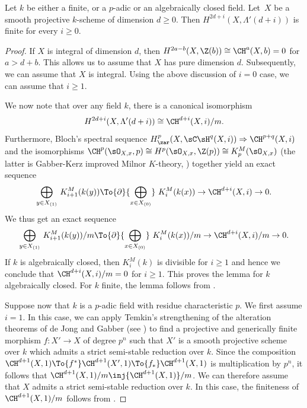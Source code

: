 \begin{lem}\label{lem:smooth-proj-fin}
Let $k$ be either a finite, or a $p$-adic or an algebraically closed field.
Let~$X$ be a smooth projective $k$-scheme of dimension $d \ge 0$.
Then $H^{2d+i}(X, \Lambda'(d+i))$ is finite for every $i \ge 0$.
\end{lem}
\begin{proof}
If $X$ is integral of dimension $d$, then $H^{2a-b}(X, \Z(b)) \cong
\CH^a(X, b) = 0$ for $a > d+b$. This allows us to assume that
$X$ has pure dimension $d$. Subsequently, we can assume that $X$ is integral.
Using the above discussion of $i = 0$ case, we can assume that $i \ge 1$.

We now note that over any field $k$, there is a canonical isomorphism
\[
H^{2d+i}(X, \Lambda'(d+i)) \cong {\CH^{d+i}(X, i)}/m.
\]
Furthermore, Bloch's spectral sequence $H^p_\zar(X, {\sC}{\sH}^q(X,i))
\Rightarrow \CH^{p+q}(X,i)$ and
the isomorphisms $\CH^p(\sO_{X,x}, p) \cong
H^p(\sO_{X,x}, \Z(p)) \cong K^M_p(\sO_{X,x})$
(the latter is Gabber-Kerz improved Milnor $K$-theory, \cite{Kerz10})
together yield an exact sequence
\begin{equation}\label{eqn:smooth-proj-fin-0}
{\underset{y \in X_{(1)}}\bigoplus} \ K^M_{i+1}(k(y))
\To{\partial} {\underset{x \in X_{(0)}}\bigoplus} \ K^M_{i}(k(x))
\to \CH^{d+i}(X, i) \to 0.
\end{equation}
We thus get an exact sequence
\begin{equation}\label{eqn:smooth-proj-fin-2}
{\underset{y \in X_{(1)}}\bigoplus} \ {K^M_{i+1}(k(y))}/m
\To{\partial} {\underset{x \in X_{(0)}}\bigoplus} \ {K^M_{i}(k(x))}/m
\to {\CH^{d+i}(X, i)}/m \to 0.
\end{equation}
If $k$ is algebraically closed, then $K^M_{i}(k)$ is divisible for $i \ge 1$
and hence we conclude that ${\CH^{d+i}(X, i)}/m = 0$ for $i \ge 1$.
This proves the lemma for $k$ algebraically closed.
For $k$ finite, the lemma follows from \cite[Th.\,1.2, 1.3]{Akthar}.

Suppose now that $k$ is a $p$-adic field with residue characteristic $p$.
We first assume $i =1$. In this case, we can apply Temkin's
strengthening of the alteration theorems of de Jong and Gabber
(see \cite[Th.\,1.2.5]{Temkin}) to find a projective and generically
finite morphism $f \colon X' \to X$ of degree $p^n$ such that
$X'$ is a smooth projective scheme over $k$ which admits a strict semi-stable
reduction over $k$. Since the composition $\CH^{d+1}(X, 1)
\To{f^*} \CH^{d+1}(X', 1) \To{f_*} \CH^{d+1}(X, 1)$
is multiplication by $p^n$, it follows that
${\CH^{d+1}(X, 1)}/m \inj {\CH^{d+1}(X, 1)}/m$. We can therefore assume that
$X$ admits a strict semi-stable reduction over $k$. In this case, the
finiteness of ${\CH^{d+1}(X, 1)}/m$ follows from
\cite[Th.\,3.1.4]{Forre}.


\end{proof}

